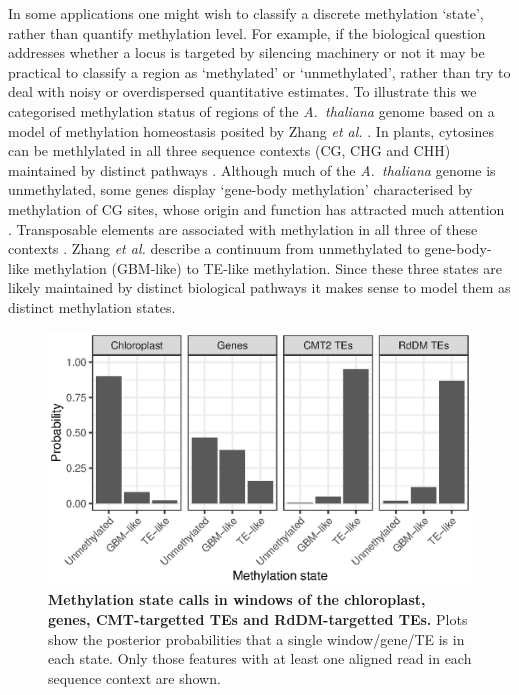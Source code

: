 \documentclass[10pt,draft,letterpaper]{article}
\begin{document}
In some applications one might wish to classify a discrete methylation `state', rather than quantify methylation level.
For example, if the biological question addresses whether a locus is targeted by silencing machinery or not it may be practical to classify a region as `methylated' or `unmethylated', rather than try to deal with noisy or overdispersed quantitative estimates.
To illustrate this we categorised methylation status of regions of the \emph{A.~thaliana} genome based on a model of methylation homeostasis posited by Zhang \textit{et al.} \cite{zhang2020natural}.
In plants, cytosines can be methlylated in all three sequence contexts (CG, CHG and CHH) maintained by distinct pathways \cite{law2010establishing}.
Although much of the \emph{A.~thaliana} genome is unmethylated, some genes display `gene-body methylation' characterised by methylation of CG sites, whose origin and function has attracted much attention \cite{muyle2022gene}. 
Transposable elements are associated with methylation in all three of these contexts \cite{cokus2008shotgun, lister2008highly}.
Zhang \textit{et al.} \cite{zhang2020natural} describe a continuum from unmethylated to gene-body-like methylation (GBM-like) to TE-like methylation.
Since these three states are likely maintained by distinct biological pathways it makes sense to model them as distinct methylation states.

\begin{figure}
    \centering
    \includegraphics{figure4.eps}
    \caption{
        {\bf Methylation state calls in windows of the chloroplast, genes, CMT-targetted TEs and RdDM-targetted TEs.}
        Plots show the posterior probabilities that a single window/gene/TE is in each state.
        Only those features with at least one aligned read in each sequence context are shown.
    }
    \label{fig:meth-state}
\end{figure}
\end{document}
